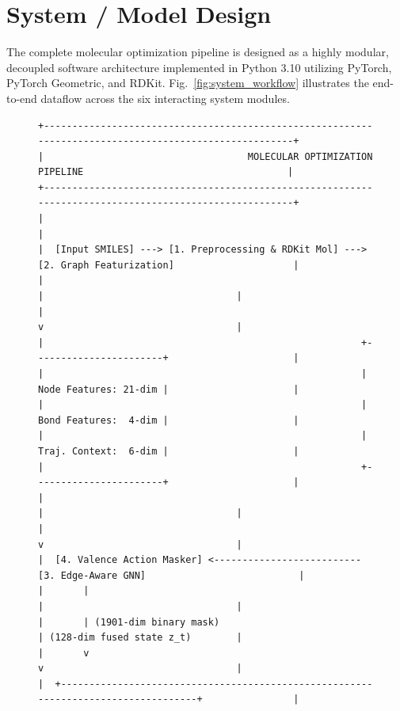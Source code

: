 \documentclass{ieeeaccess}
\begin{document}
\section{System / Model Design}
\label{sec:system}
The complete molecular optimization pipeline is designed as a highly modular, decoupled software architecture implemented in Python 3.10 utilizing PyTorch, PyTorch Geometric, and RDKit. Fig.~\ref{fig:system_workflow} illustrates the end-to-end dataflow across the six interacting system modules.

\begin{figure}[!tbp]
\centering
\small
\begin{verbatim}
+-------------------------------------------------------------------------------------------------------+
|                                    MOLECULAR OPTIMIZATION PIPELINE                                    |
+-------------------------------------------------------------------------------------------------------+
|                                                                                                       |
|  [Input SMILES] ---> [1. Preprocessing & RDKit Mol] ---> [2. Graph Featurization]                     |
|                                                                    |                                  |
|                                                                    v                                  |
|                                                        +-----------------------+                      |
|                                                        | Node Features: 21-dim |                      |
|                                                        | Bond Features:  4-dim |                      |
|                                                        | Traj. Context:  6-dim |                      |
|                                                        +-----------------------+                      |
|                                                                    |                                  |
|                                                                    v                                  |
|  [4. Valence Action Masker] <-------------------------- [3. Edge-Aware GNN]                           |
|       |                                                            |                                  |
|       | (1901-dim binary mask)                                     | (128-dim fused state z_t)        |
|       v                                                            v                                  |
|  +-----------------------------------------------------------------------------------+                |

\end{verbatim}
\end{figure}
\end{document}
